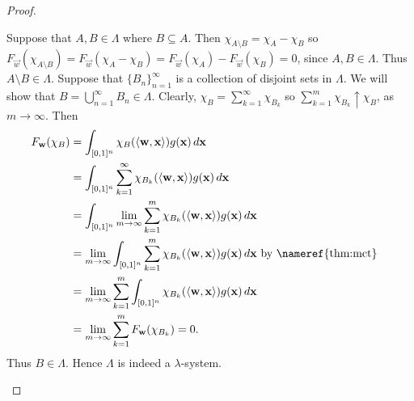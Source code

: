 \begin{proof}
\begin{step}
Suppose that $A, B \in \Lambda$ where $B \subseteq A$. Then $\chi_{A \setminus B} = \chi_A - \chi_B$ so $F_{\vec{w}}(\chi_{A \setminus B}) = F_{\vec{w}}(\chi_A - \chi_B)  =F_{\vec{w}}(\chi_A ) - F_{\vec{w}}(\chi_B) = 0$, since $A, B \in \Lambda$. Thus $A \setminus B \in \Lambda$. Suppose that $\{ B_n \}_{n =1}^\infty$ is a collection of disjoint sets in $\Lambda$. We will show that $B = \bigcup_{n=1}^\infty B_n \in \Lambda$. Clearly, $\chi_B = \sum_{k=1}^\infty \chi_{B_k}$ so $\sum_{k=1}^m \chi_{B_k} \uparrow \chi_B$, as $m \to \infty$. Then
\begin{align*}
    F_{\vec{w}}(\chi_{B}) &=  \int_{[0,1]^n} \chi_B ( \langle \vec{w}, \vec{x} \rangle  ) g(\vec{x}) \, d \vec{x} \\ 
               &=  \int_{[0,1]^n} \sum_{k=1}^\infty \chi_{B_k} ( \langle \vec{w}, \vec{x} \rangle  ) g(\vec{x}) \, d \vec{x} & \\
               &=   \int_{[0,1]^n} \lim_{m \to \infty} \sum_{k=1}^m \chi_{B_k} ( \langle \vec{w}, \vec{x} \rangle  ) g(\vec{x}) \, d \vec{x}  & \\
               &=  \lim_{m \to \infty}\int_{[0,1]^n} \sum_{k=1}^m \chi_{B_k} ( \langle \vec{w}, \vec{x} \rangle  ) g(\vec{x}) \, d \vec{x}  \text{ by \nameref{thm:mct}}  \\
               &= \lim_{m \to \infty} \sum_{k=1}^m \int_{[0,1]^n} \chi_{B_k}  ( \langle \vec{w}, \vec{x} \rangle  ) g(\vec{x}) \, d \vec{x}  &\\ 
               &=  \lim_{m \to \infty} \sum_{k=1}^m F_{\vec{w}}(\chi_{B_k}) = 0.
\end{align*}
Thus $B \in \Lambda$. Hence $\Lambda$ is indeed a $\lambda$-system.


\end{step}
\end{proof}
